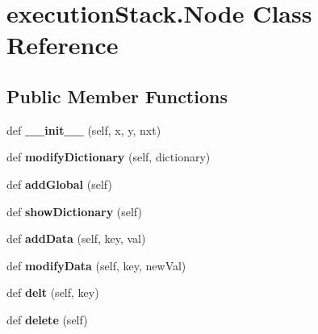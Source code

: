 \hypertarget{classexecution_stack_1_1_node}{}\section{execution\+Stack.\+Node Class Reference}
\label{classexecution_stack_1_1_node}
\subsection*{Public Member Functions}
\begin{DoxyCompactItemize}
\item 
\mbox{\label{classexecution_stack_1_1_node_a06210944064630822c82b75dfbb39b02}} 
def {\bfseries \+\_\+\+\_\+init\+\_\+\+\_\+} (self, x, y, nxt)
\item 
\mbox{\label{classexecution_stack_1_1_node_a8f6113c2ecc9b3750c2623e4f80fbcb6}} 
def {\bfseries modify\+Dictionary} (self, dictionary)
\item 
\mbox{\label{classexecution_stack_1_1_node_ad09bf2598ac130da3d81990e7a3d4033}} 
def {\bfseries add\+Global} (self)
\item 
\mbox{\label{classexecution_stack_1_1_node_acce8dc5b25b98507443871806561b712}} 
def {\bfseries show\+Dictionary} (self)
\item 
\mbox{\label{classexecution_stack_1_1_node_a1edf851a964aeb75e36218af75d84fa5}} 
def {\bfseries add\+Data} (self, key, val)
\item 
\mbox{\label{classexecution_stack_1_1_node_adaa2133dac332801505899ae26425841}} 
def {\bfseries modify\+Data} (self, key, new\+Val)
\item 
\mbox{\label{classexecution_stack_1_1_node_a4998dd88ab9c688f7d68863d2d7b8f35}} 
def {\bfseries delt} (self, key)
\item 
\mbox{\label{classexecution_stack_1_1_node_ade5473ebe64896f68673f0d5830733bb}} 
def {\bfseries delete} (self)
\end{DoxyCompactItemize}
